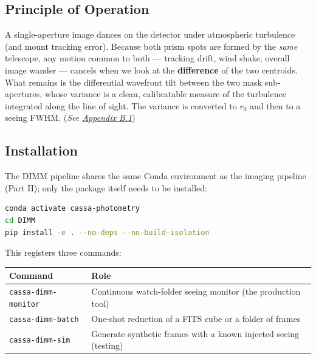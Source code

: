 \documentclass[11pt,a4paper]{article}
\begin{document}
\subsection{Principle of Operation}
A single-aperture image dances on the detector under atmospheric turbulence (and mount tracking error). Because both prism spots are formed by the \emph{same} telescope, any motion common to both --- tracking drift, wind shake, overall image wander --- cancels when we look at the \textbf{difference} of the two centroids. What remains is the differential wavefront tilt between the two mask sub-apertures, whose variance is a clean, calibratable measure of the turbulence integrated along the line of sight. The variance is converted to $r_0$ and then to a seeing FWHM. (\textit{See \hyperref[app:dimmphys]{Appendix B.1}})

\subsection{Installation}
The DIMM pipeline shares the same Conda environment as the imaging pipeline (Part II); only the package itself needs to be installed:
\begin{lstlisting}[language=bash]
conda activate cassa-photometry
cd DIMM
pip install -e . --no-deps --no-build-isolation
\end{lstlisting}
This registers three commands:
\begin{center}
\begin{tabularx}{\textwidth}{|l|X|}
\hline
\textbf{Command} & \textbf{Role} \\
\hline
\texttt{cassa-dimm-monitor} & Continuous watch-folder seeing monitor (the production tool) \\
\hline
\texttt{cassa-dimm-batch} & One-shot reduction of a FITS cube or a folder of frames \\
\hline
\texttt{cassa-dimm-sim} & Generate synthetic frames with a known injected seeing (testing) \\
\hline
\end{tabularx}
\end{center}
\end{document}
